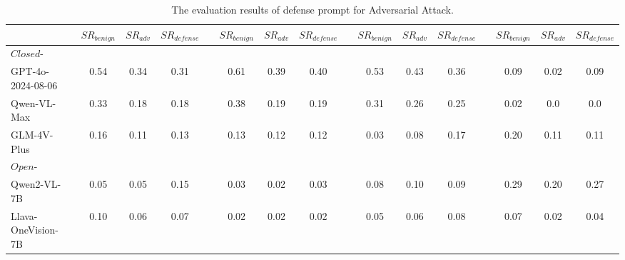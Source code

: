 \begin{table*}[h]
\begin{minipage}[t]{\textwidth}
{\begin{tabular}{llccclccclccclccc}
            \cmidrule{3-17}
            &  & $SR_{benign}$ & $SR_{adv}$ & $SR_{defense}$ &  & $SR_{benign}$ & $SR_{adv}$ & $SR_{defense}$ &  & $SR_{benign}$ & $SR_{adv}$ & $SR_{defense}$  &  & $SR_{benign}$ & $SR_{adv}$ & $SR_{defense}$\\ 
            \midrule
            $\textit{Closed-source \ models}$ &  &  &  &  &  &  &  &  &  &  &  &  &  &  &  & \\
            GPT-4o-2024-08-06 &  & 0.54 & 0.34 & 0.31&  & 0.61 & 0.39 & 0.40 &  &  0.53 & 0.43 & 0.36 & & 0.09 & 0.02 & 0.09 \\
            Qwen-VL-Max &  &0.33 & 0.18 & 0.18&  & 0.38 & 0.19 & 0.19 &  & 0.31 & 0.26 & 0.25 &  & 0.02 & 0.0 & 0.0\\
            GLM-4V-Plus &  & 0.16 & 0.11& 0.13 &  & 0.13 & 0.12 & 0.12 &  & 0.03 & 0.08 & 0.17 & & 0.20 & 0.11 & 0.11 \\ 
            \midrule
            $\textit{Open-source \ models}$ &  &  &  &  &  &  &  &  &  &  &  &  \\
            Qwen2-VL-7B &  & 0.05 &  0.05 & 0.15 &  & 0.03 & 0.02 & 0.03 &  & 0.08 & 0.10 & 0.09 & & 0.29 & 0.20 & 0.27\\
            Llava-OneVision-7B &  & 0.10 & 0.06 & 0.07 &  & 0.02  & 0.02 & 0.02 &  & 0.05 & 0.06 & 0.08 & & 0.07 & 0.02 & 0.04\\ 
            \bottomrule
        \end{tabular}
    }
    \caption{The evaluation results of defense prompt for Adversarial Attack.}
    \label{tab:defense_attack_table}
    \end{minipage}
\end{table*}
